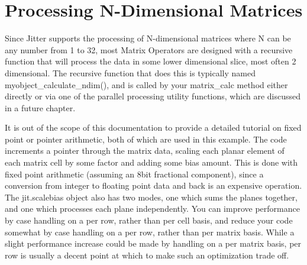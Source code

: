 \hypertarget{chapter_jit_mopqs_chapter_jit_mopqs_ndim}{}\section{Processing N-\/Dimensional Matrices}\label{chapter_jit_mopqs_chapter_jit_mopqs_ndim}
Since Jitter supports the processing of N-\/dimensional matrices where N can be any number from 1 to 32, most Matrix Operators are designed with a recursive function that will process the data in some lower dimensional slice, most often 2 dimensional. The recursive function that does this is typically named myobject\_\-calculate\_\-ndim(), and is called by your matrix\_\-calc method either directly or via one of the parallel processing utility functions, which are discussed in a future chapter.

It is out of the scope of this documentation to provide a detailed tutorial on fixed point or pointer arithmetic, both of which are used in this example. The code increments a pointer through the matrix data, scaling each planar element of each matrix cell by some factor and adding some bias amount. This is done with fixed point arithmetic (assuming an 8bit fractional component), since a conversion from integer to floating point data and back is an expensive operation. The jit.scalebias object also has two modes, one which sums the planes together, and one which processes each plane independently. You can improve performance by case handling on a per row, rather than per cell basis, and reduce your code somewhat by case handling on a per row, rather than per matrix basis. While a slight performance increase could be made by handling on a per matrix basis, per row is usually a decent point at which to make such an optimization trade off.


